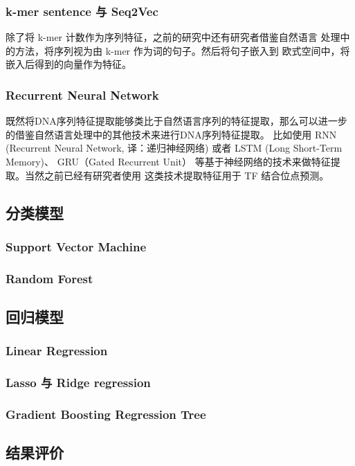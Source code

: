 \documentclass[UTF8]{ctexart}
\begin{document}
  \subsubsection{k-mer sentence 与 Seq2Vec}
  除了将 k-mer 计数作为序列特征，之前的研究中还有研究者借鉴自然语言
  处理中的方法，将序列视为由 k-mer 作为词的句子。然后将句子嵌入到
  欧式空间中，将嵌入后得到的向量作为特征\autocite{zeng2018prediction}。

  \subsubsection{Recurrent Neural Network}
  既然将DNA序列特征提取能够类比于自然语言序列的特征提取，那么可以进一步
  的借鉴自然语言处理中的其他技术来进行DNA序列特征提取。
  比如使用 RNN (Recurrent Neural Network, 译：递归神经网络)
  或者 LSTM (Long Short-Term Memory)\autocite{hochreiter1997long}、
  GRU（Gated Recurrent Unit）\autocite{cho2014learning}
  等基于神经网络的技术来做特征提取。当然之前已经有研究者使用
  这类技术提取特征用于 TF 结合位点预测\autocite{shen2018recurrent}。

  \subsection{分类模型}
  \subsubsection{Support Vector Machine}
  \subsubsection{Random Forest}

  \subsection{回归模型}
  \subsubsection{Linear Regression}
  \subsubsection{Lasso 与 Ridge regression}
  \subsubsection{Gradient Boosting Regression Tree}

  \subsection{结果评价}
\end{document}
